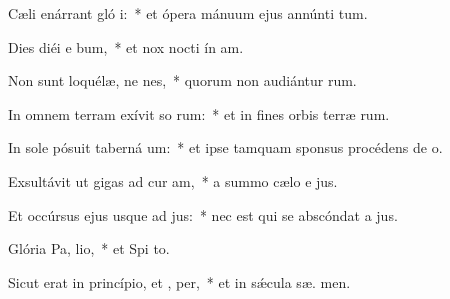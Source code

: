 \item Cæli enárrant gló i:~* et ópera mánuum ejus annúnti tum.
\item Dies diéi e bum,~* et nox nocti ín am.
\item Non sunt loquélæ, ne nes,~* quorum non audiántur  rum.
\item In omnem terram exívit so rum:~* et in fines orbis terræ  rum.
\item In sole pósuit taberná um:~* et ipse tamquam sponsus procédens de  o.
\item Exsultávit ut gigas ad cur am,~* a summo cælo e jus.
\item Et occúrsus ejus usque ad  jus:~* nec est qui se abscóndat a  jus.
\item Glória Pa,  lio,~* et Spi to.
\item Sicut erat in princípio, et ,  per,~* et in sǽcula sæ. men.

